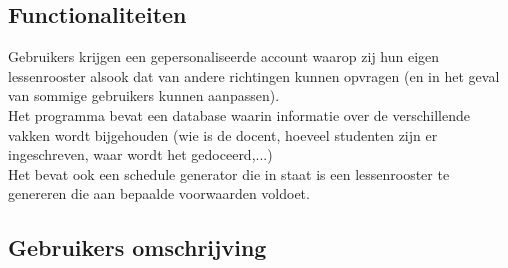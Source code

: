 \documentclass{article}
\begin{document}

\subsection{Functionaliteiten}

Gebruikers krijgen een gepersonaliseerde account waarop zij hun eigen lessenrooster alsook dat van andere richtingen kunnen opvragen (en in het geval van sommige gebruikers kunnen aanpassen).\\
Het programma bevat een database waarin informatie over de verschillende vakken wordt bijgehouden (wie is de docent, hoeveel studenten zijn er ingeschreven, waar wordt het gedoceerd,...)\\
Het bevat ook een schedule generator die in staat is een lessenrooster te genereren die aan bepaalde voorwaarden voldoet.

\subsection{Gebruikers omschrijving}
\end{document}
